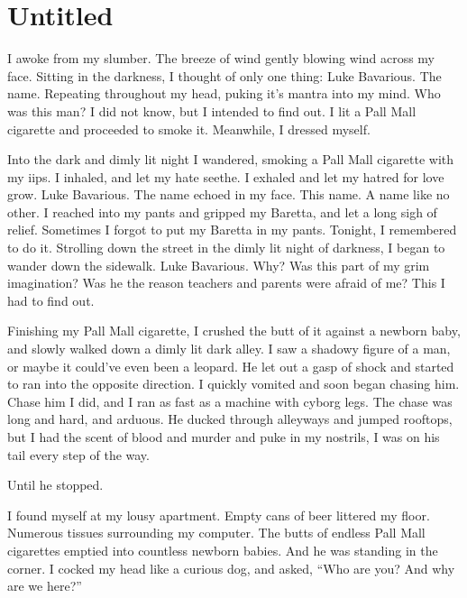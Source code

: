 \chapter{Untitled}


I awoke from my slumber. The breeze of wind gently blowing wind
across my face. Sitting in the darkness, I thought of only one
thing: Luke Bavarious. The name. Repeating throughout my head,
puking it's mantra into my mind. Who was this man? I did not know,
but I intended to find out. I lit a Pall Mall cigarette and
proceeded to smoke it. Meanwhile, I dressed myself.



Into the dark and dimly lit night I wandered, smoking a Pall Mall
cigarette with my iips. I inhaled, and let my hate seethe. I
exhaled and let my hatred for love grow. Luke Bavarious. The name
echoed in my face. This name. A name like no other. I reached into
my pants and gripped my Baretta, and let a long sigh of relief.
Sometimes I forgot to put my Baretta in my pants. Tonight, I
remembered to do it. Strolling down the street in the dimly lit
night of darkness, I began to wander down the sidewalk. Luke
Bavarious. Why? Was this part of my grim imagination? Was he the
reason teachers and parents were afraid of me? This I had to find
out.



Finishing my Pall Mall cigarette, I crushed the butt of it against
a newborn baby, and slowly walked down a dimly lit dark alley. I
saw a shadowy figure of a man, or maybe it could've even been a
leopard. He let out a gasp of shock and started to ran into the
opposite direction. I quickly vomited and soon began chasing him.
Chase him I did, and I ran as fast as a machine with cyborg legs.
The chase was long and hard, and arduous. He ducked through
alleyways and jumped rooftops, but I had the scent of blood and
murder and puke in my nostrils, I was on his tail every step of the
way.



Until he stopped.







I found myself at my lousy apartment. Empty cans of beer littered
my floor. Numerous tissues surrounding my computer. The butts of
endless Pall Mall cigarettes emptied into countless newborn babies.
And he was standing in the corner. I cocked my head like a curious
dog, and asked, ``Who are you? And why are we here?''



